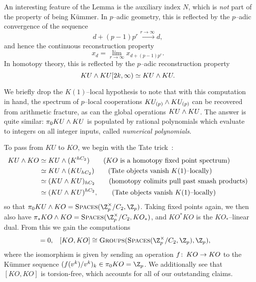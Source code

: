 \begin{remark}
An interesting feature of the Lemma is the auxiliary index \(N\), which is \emph{not} part of the property of being K\"ummer.  In \(p\)--adic geometry, this is reflected by the \(p\)--adic convergence of the sequence \[d + (p-1)p^r \xrightarrow{r \to \infty} d,\] and hence the continuous reconstruction property \[x_d = \lim_{r \to \infty} x_{d + (p-1)p^r}.\]  In homotopy theory, this is reflected by the \(p\)--adic reconstruction property \[KU \wedge KU[2k, \infty) \simeq KU \wedge KU.\]
\end{remark}

\begin{remark}
We briefly drop the \(K(1)\)--local hypothesis to note that with this computation in hand, the spectrum of \(p\)--local cooperations \(KU_{(p)} \wedge KU_{(p)}\) can be recovered from arithmetic fracture, as can the global operations \(KU \wedge KU\).  The answer is quite similar: \(\pi_0 KU \wedge KU\) is populated by rational polynomials which evaluate to integers on all integer inputs, called \textit{numerical polynomials}.
\end{remark}

To pass from \(KU\) to \(KO\), we begin with the Tate trick~\cite{ClausenMathew,GreenleesSadofsky,HoveySadofsky}:
\begin{align*}
KU \wedge KO & \simeq KU \wedge (K^{hC_2}) \tag{\(KO\) is a homotopy fixed point spectrum} \\
& \simeq KU \wedge (KU_{hC_2}) \tag{Tate objects vanish \(K(1)\)--locally} \\
& \simeq (KU \wedge KU)_{hC_2} \tag{homotopy colimits pull past smash products} \\
& \simeq (KU \wedge KU)^{hC_2}, \tag{Tate objects vanish \(K(1)\)--locally}
\end{align*}
so that \(\pi_0 KU \sm KO = \CatOf{Spaces}(\Z_p^\times / C_2, \Z_p)\).  Taking fixed points again, we then also have \(\pi_* KO \sm KO = \CatOf{Spaces}(\Z_p^\times / C_2, KO_*)\), and \(KO^* KO\) is the \(KO_*\)--linear dual.  From this we gain the computations
\begin{align*}
[\Susp^{-1} KO, KO] & = 0, &
[KO, KO] & \cong \CatOf{Groups}(\CatOf{Spaces}(\Z_p^\times / C_2, \Z_p), \Z_p),
\end{align*}
where the isomorphism is given by sending an operation \(f\colon\thinspace KO \to KO\) to the K\"ummer sequence \((f(v^k)/v^k)_k \in \pi_0 KO = \Z_p\).  We additionally see that \([KO, KO]\) is torsion-free, which accounts for all of our outstanding claims.


